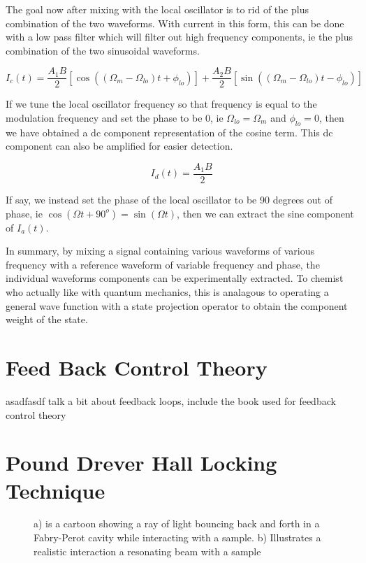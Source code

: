 \documentclass[a4paper]{book}
\newcommand{\imginput}[1]{} %
\begin{document}
			The goal now after mixing with the local oscillator is to rid of the plus combination of the two waveforms. With current in this form, this can be done with a low pass filter which will filter out high frequency components, ie the plus combination of the two sinusoidal waveforms.
		
			\begin{equation}
				I_c(t) = \dfrac{A_1 B}{2} \left[\cos{\left(\left(\Omega_m-\Omega_{lo} \right)t +\phi_{lo}\right)}\right]
				+\dfrac{A_2 B}{2}\left[\sin{\left(\left(\Omega_m-\Omega_{lo}\right)t-\phi_{lo}\right)}\right]
			\end{equation}					
			
			If we tune the local oscillator frequency so that frequency is equal to the modulation frequency and set the phase to be 0, ie $\Omega_{lo}=\Omega_m$ and $\phi_{lo}=0$, then we have obtained a dc component representation of the cosine term. This dc component can also be amplified for easier detection.
		
			\begin{equation}
				I_d(t) = \dfrac{A_1 B}{2}
			\end{equation}	
		
			If say, we instead set the phase of the local oscillator to be 90 degrees out of phase, ie $\cos(\Omega t + 90^o)=\sin(\Omega t)$, then we can extract the sine component of $I_a(t)$.
			
			In summary, by mixing a signal containing various waveforms of various frequency with a reference waveform of variable frequency and phase, the individual waveforms components can be experimentally extracted. To chemist who actually like with quantum mechanics, this is analagous to operating a general wave function with a state projection operator to obtain the component weight of the state.

	\section{Feed Back Control Theory}
		\label{sec:Feed Back Control Theory}
		asadfasdf talk a bit about feedback loops, include the book used for feedback control theory

	\section{Pound Drever Hall Locking Technique}
		\label{sec:Pound Drever Hall Locking Technique}
		
		\begin{figure} [!ht]
			\centering
			\def\svgwidth{\columnwidth}
			\resizebox{160mm}{!}{\imginput{images/PDH-setup.pdf_tex}}
			\label{fig:PDHSetup}
			\caption{a) is a cartoon showing a ray of light bouncing back and forth in a Fabry-Perot cavity while interacting with a sample. b) Illustrates a realistic interaction a resonating beam with a sample }
		\end{figure}
		
\end{document}
